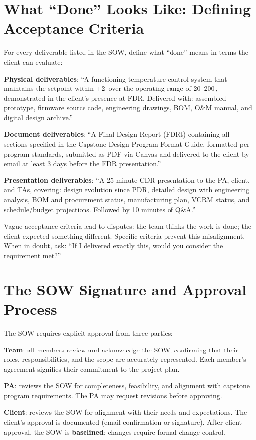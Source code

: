 \section{What ``Done'' Looks Like: Defining Acceptance Criteria}
For every deliverable listed in the SOW, define what ``done'' means in terms the client can evaluate:

\textbf{Physical deliverables}: ``A functioning temperature control system that maintains the setpoint within $\pm$2\,\degC{} over the operating range of 20--200\,\degC{}, demonstrated in the client's presence at FDR. Delivered with: assembled prototype, firmware source code, engineering drawings, BOM, O\&M manual, and digital design archive.''

\textbf{Document deliverables}: ``A Final Design Report (FDRt) containing all sections specified in the Capstone Design Program Format Guide, formatted per program standards, submitted as PDF via Canvas and delivered to the client by email at least 3 days before the FDR presentation.''

\textbf{Presentation deliverables}: ``A 25-minute CDR presentation to the PA, client, and TAs, covering: design evolution since PDR, detailed design with engineering analysis, BOM and procurement status, manufacturing plan, VCRM status, and schedule/budget projections. Followed by 10 minutes of Q\&A.''

Vague acceptance criteria lead to disputes: the team thinks the work is done; the client expected something different. Specific criteria prevent this misalignment. When in doubt, ask: ``If I delivered exactly this, would you consider the requirement met?''

\section{The SOW Signature and Approval Process}
The SOW requires explicit approval from three parties:

\textbf{Team}: all members review and acknowledge the SOW, confirming that their roles, responsibilities, and the scope are accurately represented. Each member's agreement signifies their commitment to the project plan.

\textbf{PA}: reviews the SOW for completeness, feasibility, and alignment with capstone program requirements. The PA may request revisions before approving.

\textbf{Client}: reviews the SOW for alignment with their needs and expectations. The client's approval is documented (email confirmation or signature). After client approval, the SOW is \textbf{baselined}; changes require formal change control.

